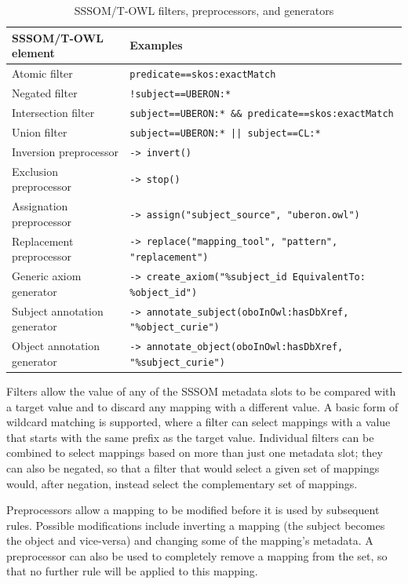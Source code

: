 \documentclass{ceurart}
\begin{document}
\begin{table}
  \caption{SSSOM/T-OWL filters, preprocessors, and generators}
  \label{tab:sssomt}
  \begin{tabular}{ll}
    \toprule
    SSSOM/T-OWL element & Examples\\
    \midrule
    Atomic filter & \verb|predicate==skos:exactMatch|\\
    Negated filter & \verb|!subject==UBERON:*|\\
    Intersection filter & \verb|subject==UBERON:* && predicate==skos:exactMatch|\\
    Union filter & \verb+subject==UBERON:* || subject==CL:*+\\
    \midrule
    Inversion preprocessor & \verb|-> invert()|\\
    Exclusion preprocessor & \verb|-> stop()|\\
    Assignation preprocessor & \verb|-> assign("subject_source", "uberon.owl")|\\
    Replacement preprocessor & \verb|-> replace("mapping_tool", "pattern", "replacement")|\\
    \midrule
    Generic axiom generator & \verb|-> create_axiom("%subject_id EquivalentTo: %object_id")|\\
    Subject annotation generator & \verb|-> annotate_subject(oboInOwl:hasDbXref, "%object_curie")|\\
    Object annotation generator & \verb|-> annotate_object(oboInOwl:hasDbXref, "%subject_curie")|\\
    \bottomrule
  \end{tabular}
\end{table}

Filters allow the value of any of the SSSOM metadata slots to be
compared with a target value and to discard any mapping with a different
value. A basic form of wildcard matching is supported, where a filter
can select mappings with a value that starts with the same prefix as the
target value. Individual filters can be combined to select mappings
based on more than just one metadata slot; they can also be negated, so
that a filter that would select a given set of mappings would, after
negation, instead select the complementary set of mappings.

Preprocessors allow a mapping to be modified before it is used by
subsequent rules. Possible modifications include inverting a mapping
(the subject becomes the object and vice-versa) and changing some of the
mapping's metadata. A preprocessor can also be used to completely remove
a mapping from the set, so that no further rule will be applied to this
mapping.
\end{document}
